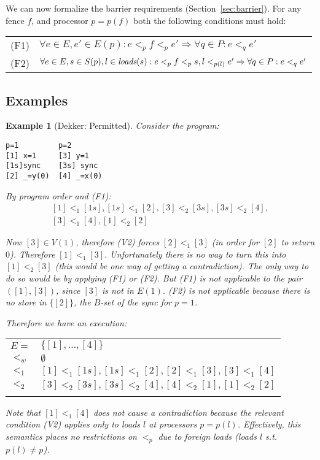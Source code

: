 \documentclass[10pt]{article}
\newtheorem{example}{Example}[section]
\def\loads{\mbox{\em loads}}
\begin{document}
We can now formalize the barrier requirements (Section~\ref{sec:barrier}).
For any fence $f$, and processor $p=p(f)$ both the following
conditions must hold:

\begin{tabular}[t]{ll}
(F1) & $\forall e\in E,e'\in E(p): e <_p f <_p e' \Rightarrow \forall q\in P: e <_q e'$\\
(F2) & $\forall e\in E,s\in S(p),l\in\loads(s): e <_p f <_p s,  l <_{p(l)} e' \Rightarrow \forall q\in P: e <_q e'$\\
\end{tabular}


\subsection{Examples}

\begin{example}[Dekker: Permitted]
Consider the program:
\begin{verbatim}
p=1         p=2         
[1] x=1     [3] y=1
[1s]sync    [3s] sync
[2] _=y(0)  [4] _=x(0)
\end{verbatim}

By program order and (F1):
$$ 
\begin{array}{l}
[1] <_1 [1s], [1s] <_1 [2], [3] <_2 [3s], [3s] <_2 [4],\\{}
[3] <_1 [4], [1] <_2 [2]  
\end{array}
$$

Now $[3]\in V(1)$, therefore (V2) forces $[2] <_1 [3]$ (in order for
$[2]$ to return $0$). Therefore $[1] <_1 [3]$. Unfortunately there is
no way to turn this into $[1] <_2 [3]$ (this would be one way of
getting a contradiction). The only way to do so would be by applying
(F1) or (F2). But (F1) is not applicable to the pair $([1],[3])$,
since $[3]$ is not in $E(1)$. (F2) is not applicable because there is
no store in $\{[2]\}$, the $B$-set of the sync for $p=1$.

Therefore we have an execution:

\begin{tabular}[t]{ll}
  $E=$ & $\{[1],\ldots, [4]\}$ \\
  $<_w$ & $\emptyset$\\
  $<_1$ & $[1] <_1 [1s], [1s] <_1 [2], [2] <_1 [3], [3] <_1 [4]$\\{}
  $<_2$ & $[3] <_2 [3s], [3s] <_2 [4], [4] <_2 [1], [1] <_2 [2]$\\{}
\end{tabular}

Note that $[1] <_1 [4]$ does not cause a contradiction because the
relevant condition (V2) applies only to loads $l$ at processors
$p=p(l)$. Effectively, this semantics places no restrictions on
$<_p$ due to foreign loads (loads $l$ s.t. $p(l) \not= p$).

\end{example}
\end{document}
